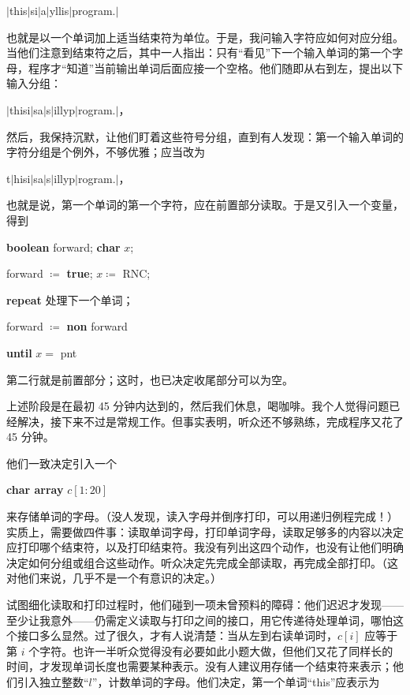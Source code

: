 \quad $\mid$this\textendash $\mid$si\textendash $\mid$a\textendash $\mid$yllis\textendash $\mid$program.$\mid$

\noindent
也就是以一个单词加上适当结束符为单位。于是，我问输入字符应如何对应分组。当他们注意到结束符之后，其中一人指出：只有“看见”下一个输入单词的第一个字母，程序才“知道”当前输出单词后面应接一个空格。他们随即从右到左，提出以下输入分组：

\quad $\mid$this\textemdash{}i$\mid$s\textemdash{}a$\mid$\textemdash{}s$\mid$illy\textemdash{}p$\mid$rogram\textemdash{}.$\mid$，

\noindent
然后，我保持沉默，让他们盯着这些符号分组，直到有人发现：第一个输入单词的字符分组是个例外，不够优雅；应当改为

\quad t$\mid$his\textemdash{}i$\mid$s\textemdash{}a$\mid$\textemdash{}s$\mid$illy\textemdash{}p$\mid$rogram\textemdash{}.$\mid$，

\noindent
也就是说，第一个单词的第一个字符，应在前置部分读取。于是又引入一个变量，得到

\quad \textbf{boolean} forward; \textbf{char} $x$;

\quad forward $\coloneq$ \textbf{true}; $x \coloneq$ RNC;

\quad \textbf{repeat} 处理下一个单词；

\quad \quad forward $\coloneq$ \textbf{non} forward

\quad \textbf{until} $x =$ pnt

\noindent
第二行就是前置部分；这时，也已决定收尾部分可以为空。

上述阶段是在最初 45 分钟内达到的，然后我们休息，喝咖啡。我个人觉得问题已经解决，接下来不过是常规工作。但事实表明，听众还不够熟练，完成程序又花了 45 分钟。

他们一致决定引入一个

\quad \textbf{char array} $c[1:20]$

\noindent
来存储单词的字母。（没人发现，读入字母并倒序打印，可以用递归例程完成！）实质上，需要做四件事：读取单词字母，打印单词字母，读取足够多的内容以决定应打印哪个结束符，以及打印结束符。我没有列出这四个动作，也没有让他们明确决定如何分组或组合这些动作。听众决定先完成全部读取，再完成全部打印。（这对他们来说，几乎不是一个有意识的决定。）

试图细化读取和打印过程时，他们碰到一项未曾预料的障碍：他们迟迟才发现——至少让我意外——仍需定义读取与打印之间的接口，用它传递待处理单词，哪怕这个接口多么显然。过了很久，才有人说清楚：当从左到右读单词时，$c[i]$ 应等于第 $i$ 个字符。也许一半听众觉得没有必要如此小题大做，但他们又花了同样长的时间，才发现单词长度也需要某种表示。没有人建议用存储一个结束符来表示；他们引入独立整数“$l$”，计数单词的字母。他们决定，第一个单词“this”应表示为

